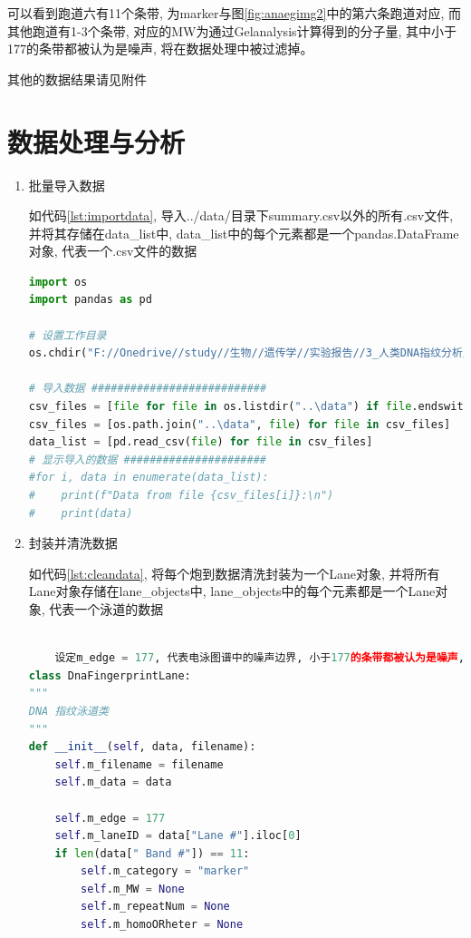 \documentclass[AutoFakeBold]{LZUThesis}
\begin{document}
可以看到跑道六有11个条带, 为marker与图\ref{fig:anaegimg2}中的第六条跑道对应, 而其他跑道有1-3个条带, 对应的MW为通过Gelanalysis计算得到的分子量, 其中小于177的条带都被认为是噪声, 将在数据处理中被过滤掉。

其他的数据结果请见附件

\section{数据处理与分析}
\begin{enumerate}
    \item 批量导入数据\par
    如代码\ref{lst:importdata}, 导入../data/目录下summary.csv以外的所有.csv文件, 并将其存储在data\_list中, data\_list中的每个元素都是一个pandas.DataFrame对象, 代表一个.csv文件的数据
    \begin{lstlisting}[language=python, caption={批量导入数据}, label={lst:importdata}, style=myPythonStyle]
import os
import pandas as pd

# 设置工作目录
os.chdir("F://Onedrive//study//生物//遗传学//实验报告//3_人类DNA指纹分析//python")

# 导入数据 ###########################
csv_files = [file for file in os.listdir("..\data") if file.endswith(".csv") and file != "summary.csv"]
csv_files = [os.path.join("..\data", file) for file in csv_files]
data_list = [pd.read_csv(file) for file in csv_files]
# 显示导入的数据 ######################
#for i, data in enumerate(data_list):
#    print(f"Data from file {csv_files[i]}:\n")
#    print(data)
    \end{lstlisting}

    \item 封装并清洗数据\par
    如代码\ref{lst:cleandata}, 将每个炮到数据清洗封装为一个Lane对象, 并将所有Lane对象存储在lane\_objects中, lane\_objects中的每个元素都是一个Lane对象, 代表一个泳道的数据
    \begin{lstlisting}[language=python, caption={封装并清洗数据}, label={lst:cleandata}, style=myPythonStyle]
    
    设定m_edge = 177, 代表电泳图谱中的噪声边界, 小于177的条带都被认为是噪声, 将在数据处理中被过滤掉
class DnaFingerprintLane:
"""
DNA 指纹泳道类
"""
def __init__(self, data, filename):
    self.m_filename = filename
    self.m_data = data
    
    self.m_edge = 177
    self.m_laneID = data["Lane #"].iloc[0]
    if len(data[" Band #"]) == 11:
        self.m_category = "marker"
        self.m_MW = None
        self.m_repeatNum = None
        self.m_homoORheter = None
    

\end{lstlisting}
\end{enumerate}
\end{document}
